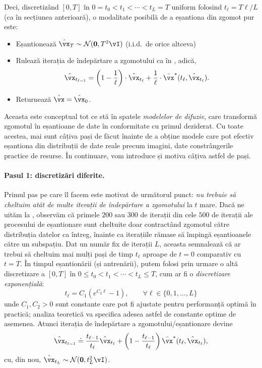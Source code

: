 \documentclass[../../book-main_ro.tex]{subfiles}
\begin{document}
Deci, discretizând \([0, T]\) în \(0 = t_{0} < t_{1} < \cdots < t_{L} = T\) uniform folosind \(t_{\ell} = T\ell / L\) (ca în secțiunea anterioară), o modalitate posibilă de a eșantiona din zgomot pur este:
\begin{itemize}
	\item Eșantionează \(\hat{\vx}_{T} \sim \dNorm(\vzero, T^{2}\vI)\) (i.i.d.~de orice altceva) 
	\item Rulează iterația de îndepărtare a zgomotului ca în , adică,
		\begin{equation}\label{eq:denoising-iteration-basic}
		\hat{\vx}_{t_{\ell - 1}} = \bp{1 - \frac{1}{\ell}}\cdot\hat{\vx}_{t_{\ell}} + \frac{1}{\ell}\cdot\bar{\vx}^{\ast}(t_{\ell}, \hat{\vx}_{t_{\ell}}).
	\end{equation}
	\item Returnează \(\hat{\vx} = \hat{\vx}_{0}\).
\end{itemize}
Aceasta este conceptual tot ce stă în spatele \textit{modelelor de difuzie}, care transformă zgomotul în eșantioane de date în conformitate cu primul deziderat. Cu toate acestea, mai sunt câțiva pași de făcut înainte de a obține modele care pot efectiv eșantiona din distribuții de date reale precum imagini, date constrângerile practice de resurse. În continuare, vom introduce și motiva câțiva astfel de pași.

\paragraph{Pasul 1: discretizări diferite.} Primul pas pe care îl facem este motivat de următorul punct: \textit{nu trebuie să cheltuim atât de multe iterații de îndepărtare a zgomotului} la \(t\) mare. Dacă ne uităm la , observăm că primele \(200\) sau \(300\) de iterații din cele \(500\) de iterații ale procesului de eșantionare sunt cheltuite doar contractând zgomotul către distribuția datelor ca întreg, înainte ca iterațiile rămase să împingă eșantioanele către un subspațiu. Dat un număr fix de iterații \(L\), aceasta semnalează că ar trebui să cheltuim mai mulți pași de timp \(t_{\ell}\) aproape de \(t = 0\) comparativ cu \(t = T\). În timpul eșantionării (și antrenării), putem folosi prin urmare o altă discretizare a \([0, T]\) în \(0 \leq t_{0} < t_{1} < \cdots < t_{L} \leq T\), cum ar fi o \textit{discretizare exponențială}:
\begin{equation}\label{eq:denoising_exponential_discretization}
	t_{\ell} = C_{1}(e^{C_{2}\ell} - 1), \qquad \forall \ell \in \{0, 1, \dots, L\}
\end{equation}
unde \(C_{1}, C_{2} > 0\) sunt constante care pot fi ajustate pentru performanță optimă în practică; analiza teoretică va specifica adesea astfel de constante optime de asemenea. Atunci iterația de îndepărtare a zgomotului/eșantionare devine 
\begin{equation}\label{eq:denoising_iteration}
	\hat{\vx}_{t_{\ell - 1}} \doteq \frac{t_{\ell - 1}}{t_{\ell}}\hat{\vx}_{t_{\ell}} + \bp{1 - \frac{t_{\ell - 1}}{t_{\ell}}}\bar{\vx}^{\ast}(t_{\ell}, \hat{\vx}_{t_{\ell}}),
\end{equation}
cu, din nou, \(\hat{\vx}_{t_{L}} \sim \dNorm(\vzero, t_{L}^{2}\vI)\).
\end{document}
